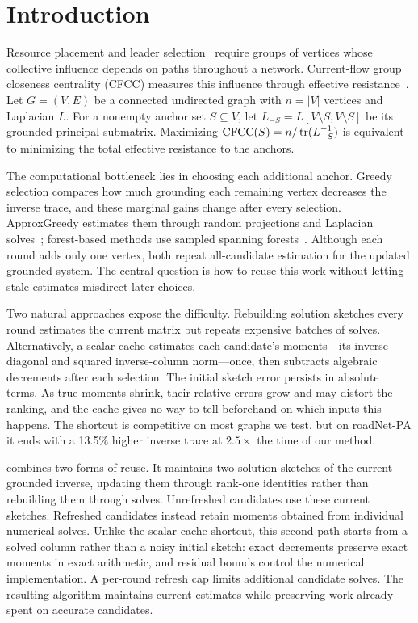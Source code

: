 \section{Introduction}\label{sec:intro}
Resource placement and leader
selection~\cite{patterson2010,clark2014,lin2014} require groups of
vertices whose collective influence depends on paths throughout a
network.
Current-flow group closeness centrality (CFCC) measures this influence
through effective resistance~\cite{li2019}. Let $G=(V,E)$ be a
connected undirected graph with $n=|V|$ vertices and Laplacian $L$.
For a nonempty anchor set $S\subseteq V$, let
$L_{-S}=L[V\setminus S,V\setminus S]$ be its grounded principal
submatrix. Maximizing $\operatorname{CFCC}(S)=n/\operatorname{tr}(L_{-S}^{-1})$ is equivalent
to minimizing the total effective resistance to the anchors.

The computational bottleneck lies in choosing each additional anchor.
Greedy selection compares how much grounding each remaining vertex
decreases the inverse trace, and these marginal gains change after
every selection. ApproxGreedy estimates them through random
projections and Laplacian solves~\cite{li2019}; forest-based methods
use sampled spanning forests~\cite{xia2025}. Although each round
adds only one vertex, both repeat all-candidate estimation for the
updated grounded system. The central question is how to reuse this
work without letting stale estimates misdirect later choices.

Two natural approaches expose the difficulty. Rebuilding solution
sketches every round estimates the current matrix but repeats expensive
batches of solves. Alternatively, a scalar cache estimates each
candidate's moments---its inverse diagonal and squared inverse-column
norm---once, then subtracts algebraic decrements after each selection.
The initial sketch error persists in absolute terms. As true moments
shrink, their relative errors grow and may distort the ranking, and
the cache gives no way to tell beforehand on which inputs this happens.
The shortcut is competitive on most graphs we test, but on roadNet-PA
it ends with a 13.5\% higher inverse trace at $2.5\times$ the time of
our method.

\alg{} combines two forms of reuse. It maintains two solution sketches
of the current grounded inverse, updating them through rank-one
identities rather than rebuilding them through solves. Unrefreshed
candidates use these current sketches. Refreshed candidates instead
retain moments obtained from individual numerical solves.
Unlike the scalar-cache shortcut, this second path starts from a
solved column rather than a noisy initial sketch: exact decrements
preserve exact moments in exact arithmetic, and residual bounds
control the numerical implementation. A per-round refresh cap limits
additional candidate solves. The resulting algorithm maintains current
estimates while preserving work already spent on accurate candidates.

